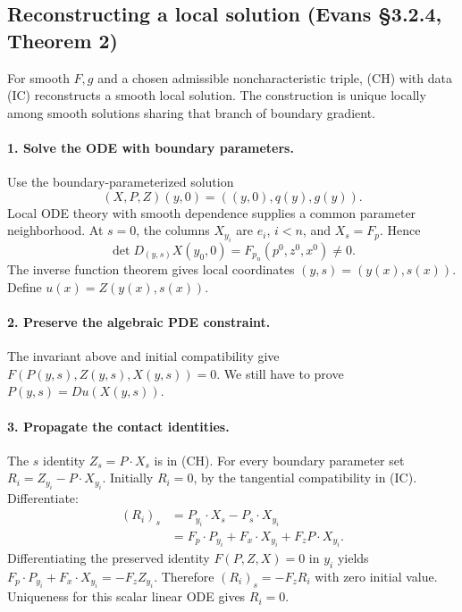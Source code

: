 \subsection{Reconstructing a local solution (Evans \S3.2.4, Theorem 2)}
\Needspace{45mm}
\begin{theorem}\label{thm:3-local}
For smooth $F,g$ and a chosen admissible noncharacteristic triple,
(CH) with data (IC) reconstructs a smooth local solution.
The construction is unique locally among smooth solutions sharing
that branch of boundary gradient.
\end{theorem}
\begin{expandedproof}
\paragraph{1. Solve the ODE with boundary parameters.}
Use the boundary-parameterized solution
\[
 (X,P,Z)(y,0)=((y,0),q(y),g(y)).
\]
Local ODE theory with smooth dependence supplies a common parameter neighborhood.
At $s=0$, the columns $X_{y_i}$ are $e_i$, $i<n$, and
$X_s=F_p$. Hence
\[
 \det D_{(y,s)}X(y_0,0)=F_{p_n}(p^0,z^0,x^0)\ne0.
\]
The inverse function theorem gives local coordinates
$(y,s)=(y(x),s(x))$. Define $u(x)=Z(y(x),s(x))$.

\paragraph{2. Preserve the algebraic PDE constraint.}
The invariant above and initial compatibility give
$F(P(y,s),Z(y,s),X(y,s))=0$.
We still have to prove $P(y,s)=Du(X(y,s))$.

\paragraph{3. Propagate the contact identities.}
The $s$ identity $Z_s=P\cdot X_s$ is in (CH).
For every boundary parameter set
$R_i=Z_{y_i}-P\cdot X_{y_i}$.
Initially $R_i=0$, by the tangential compatibility in (IC).
Differentiate:
\[
 \begin{split}
 (R_i)_s
 &=P_{y_i}\cdot X_s-P_s\cdot X_{y_i}\\
 &=F_p\cdot P_{y_i}+F_x\cdot X_{y_i}
                         +F_zP\cdot X_{y_i}.
 \end{split}
\]
Differentiating the preserved identity $F(P,Z,X)=0$ in $y_i$ yields
$F_p\cdot P_{y_i}+F_x\cdot X_{y_i}=-F_zZ_{y_i}$.
Therefore $(R_i)_s=-F_zR_i$ with zero initial value.
Uniqueness for this scalar linear ODE gives $R_i=0$.


\end{expandedproof}
